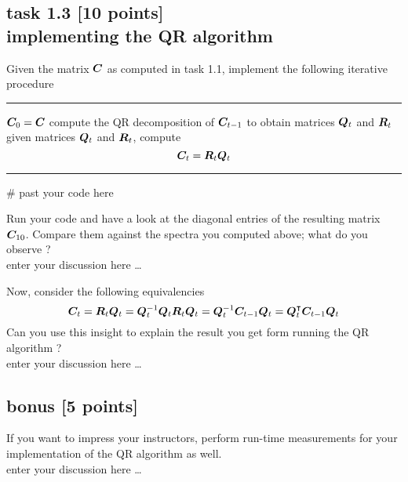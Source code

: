 
\subsection*{task 1.3 [10 points] \\[1ex] implementing the QR algorithm}

Given the matrix $\bm{C}$ as computed in task 1.1, implement the following iterative procedure

\vspace{1ex}

\hrule
\begin{algorithmic}
\State $\bm{C}_0 = \bm{C}$
\State
{}
\State
\State compute the QR decomposition of $\bm{C}_{t-1}$ to obtain matrices $\bm{Q}_t$ and $\bm{R}_t$
\State
\State given matrices $\bm{Q}_t$ and $\bm{R}_t$, compute
\begin{equation*}
\bm{C}_t = \bm{R}_t \bm{Q}_t
\end{equation*} 
\EndFor
\end{algorithmic}
\hrule
\vspace{1ex}
\begin{python}
# past your code here


\end{python}
\vfill

Run your code and have a look at the diagonal entries of the resulting matrix $\bm{C}_{10}$. Compare them against the spectra you computed above; what do you observe ?
\color{blue} \\[1ex]
enter your discussion here \ldots
\color{black}
\vspace{2cm}

Now, consider the following equivalencies
\begin{equation*}
\bm{C}_t = \bm{R}_t \bm{Q}_t = \bm{Q}_t^{-1} \bm{Q}_t \bm{R}_t \bm{Q}_t = \bm{Q}_t^{-1} \bm{C}_{t-1} \bm{Q}_t = \bm{Q}_t^\intercal \bm{C}_{t-1} \bm{Q}_t 
\end{equation*}
Can you use this insight to explain the result you get form running the QR algorithm ?
\color{blue} \\[1ex]
enter your discussion here \ldots
\color{black}
\newpage



\subsection*{bonus [5 points]}

If you want to impress your instructors, perform run-time measurements for your implementation of the QR algorithm as well.
\color{blue} \\[1ex]
enter your discussion here \ldots
\color{black}



